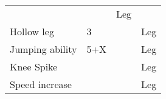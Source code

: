 \documentclass[twoside]{book}
\begin{document}
\begin{longtable}{p{1.25in}p{2em}ll}
  &
  
  &
   Leg 
  \tabularnewline
      
  \raggedright
           Hollow leg 
  &
   3 
  &
  
  &
   Leg 
  \tabularnewline
      
  \raggedright
           Jumping ability 
  &
   5+X 
  &
  
  &
   Leg 
  \tabularnewline
      
  \raggedright
           Knee Spike 
  &
  
  &
  
  &
   Leg 
  \tabularnewline
      
  \raggedright
           Speed increase 
  &
  
  &
  
  &
   Leg 
  \tabularnewline
      
\end{longtable}
    
\end{document}
